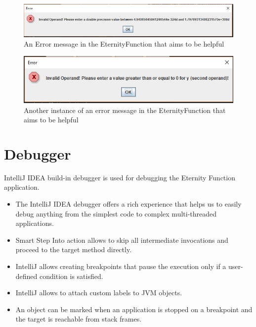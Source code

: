 \documentclass[11pt, english]{report}
\begin{document}
\begin{figure}[H]
  
  \includegraphics[width=1\textwidth]{d2p2.PNG}
  \centering
  \caption{ An Error message in the EternityFunction that aims to be helpful
}
\end{figure}

\begin{figure}[H]
  
  \includegraphics[width=1\textwidth]{d2p4.PNG}
  \centering
  \caption{ Another instance of an error message in the EternityFunction that aims to be helpful
}
\end{figure}

\section{Debugger}

IntelliJ IDEA build-in debugger is used for debugging the Eternity Function application. \\

\begin{itemize}
    \item The IntelliJ IDEA debugger offers a rich experience that helps us to easily debug anything from the simplest code to complex multi-threaded applications.
    \item Smart Step Into action allows to skip all intermediate invocations and proceed to the target method directly.
    \item IntelliJ allows creating breakpoints that pause the execution only if a user-defined condition is satisfied.
    \item IntelliJ allows to attach custom labels to JVM objects.
    \item An object can be marked when an application is stopped on a breakpoint and the target is reachable from stack frames.
\end{itemize}
\end{document}
